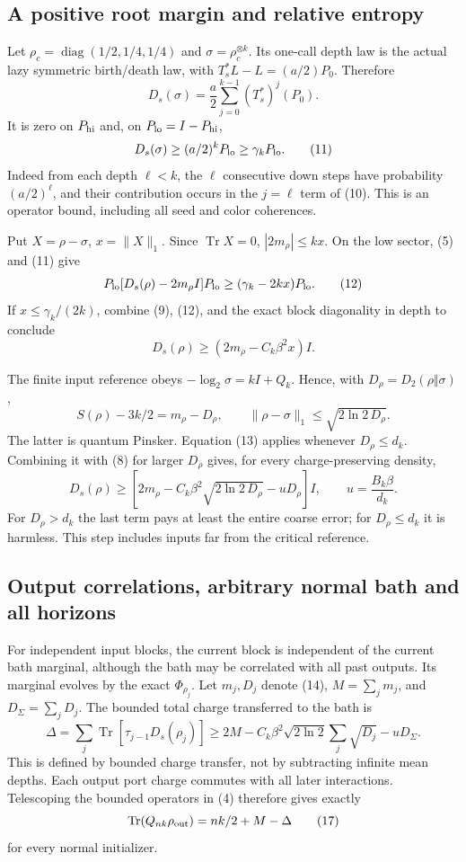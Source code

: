 \documentclass[11pt]{article}
\newcommand{\Tr}{\operatorname{Tr}}
\newcommand{\norm}[1]{\lVert #1\rVert}
\begin{document}
\subsection{A positive root margin and relative entropy}

Let $\rho_c=\operatorname{diag}(1/2,1/4,1/4)$ and
$\sigma=\rho_c^{\otimes k}$. Its one-call depth law is the actual lazy
symmetric birth/death law, with
$T_s^*L-L=(a/2)P_0$. Therefore
\[
 D_s(\sigma)=\frac a2\sum_{j=0}^{k-1}(T_s^*)^j(P_0).
 \tag{10}
\]
It is zero on $P_{\rm hi}$ and, on $P_{\rm lo}=I-P_{\rm hi}$,
\[
 D_s(\sigma)\ge(a/2)^kP_{\rm lo}\ge\gamma_kP_{\rm lo}.
 \tag{11}
\]
Indeed from each depth $\ell<k$, the $\ell$ consecutive down steps have
probability $(a/2)^\ell$, and their contribution occurs in the
$j=\ell$ term of (10). This is an operator bound, including all
seed and color coherences.

Put $X=\rho-\sigma$, $x=\norm X_1$. Since $\Tr X=0$,
$|2m_\rho|\le kx$. On the low sector, (5) and (11) give
\[
 P_{\rm lo}[D_s(\rho)-2m_\rho I]P_{\rm lo}
 \ge(\gamma_k-2kx)P_{\rm lo}.
 \tag{12}
\]
If $x\le\gamma_k/(2k)$, combine (9), (12), and the exact block
diagonality in depth to conclude
\[
 D_s(\rho)\ge(2m_\rho-C_k\beta^2x)I.
 \tag{13}
\]

The finite input reference obeys $-\log_2\sigma=kI+Q_k$. Hence, with
$D_\rho=D_2(\rho\Vert\sigma)$,
\[
 S(\rho)-3k/2=m_\rho-D_\rho,\qquad
 \norm{\rho-\sigma}_1\le\sqrt{2\ln2\,D_\rho}.
 \tag{14}
\]
The latter is quantum Pinsker. Equation (13) applies whenever
$D_\rho\le d_k$. Combining it with (8) for larger $D_\rho$ gives,
for every charge-preserving density,
\[
 D_s(\rho)\ge
 \left[2m_\rho-C_k\beta^2\sqrt{2\ln2\,D_\rho}
       -uD_\rho\right]I,\qquad u=\frac{B_k\beta}{d_k}.
 \tag{15}
\]
For $D_\rho>d_k$ the last term pays at least the entire coarse error;
for $D_\rho\le d_k$ it is harmless. This step includes inputs far from
the critical reference.

\subsection{Output correlations, arbitrary normal bath and all horizons}

For independent input blocks, the current block is independent of the
current bath marginal, although the bath may be correlated with all past
outputs. Its marginal evolves by the exact $\Phi_{\rho_j}$.
Let $m_j,D_j$ denote (14), $M=\sum_jm_j$, and $D_\Sigma=\sum_jD_j$.
The bounded total charge transferred to the bath is
\[
 \Delta=\sum_j\Tr[\tau_{j-1}D_s(\rho_j)]
 \ge2M-C_k\beta^2\sqrt{2\ln2}\sum_j\sqrt{D_j}-uD_\Sigma.
 \tag{16}
\]
This is defined by bounded charge transfer, not by subtracting infinite
mean depths. Each output port charge commutes with all later interactions.
Telescoping the bounded operators in (4) therefore gives exactly
\[
 \Tr(Q_{nk}\rho_{\rm out})=nk/2+M-\Delta
 \tag{17}
\]
for every normal initializer.
\end{document}
